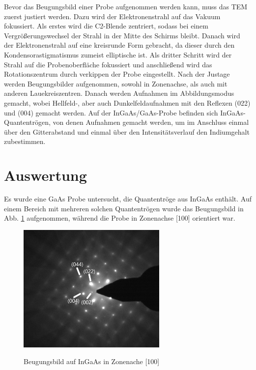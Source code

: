 \documentclass[a4paper,11pt,DIV=11]{scrartcl}
\begin{document}
Bevor das Beugungsbild einer Probe aufgenommen werden kann, muss das TEM zuerst justiert werden. Dazu wird der Elektronenstrahl auf das Vakuum fokussiert. Als erstes wird die C2-Blende zentriert, sodass bei einem Vergrößerungswechsel der Strahl in der Mitte des Schirms bleibt. Danach wird der Elektronenstrahl auf eine kreisrunde Form gebracht, da dieser durch den Kondensorastigmatismus zumeist elliptische ist. Als dritter Schritt wird der Strahl auf die Probenoberfläche fokussiert und anschließend wird das Rotationszentrum durch verkippen der Probe eingestellt. Nach der Justage werden Beugungsbilder aufgenommen, sowohl in Zonenachse, als auch mit anderen Lauekreiszentren. Danach werden Aufnahmen im Abbildungsmodus gemacht, wobei Hellfeld-, aber auch Dunkelfeldaufnahmen mit den Reflexen (022) und (004) gemacht werden. Auf der InGaAs/GaAs-Probe befinden sich InGaAs-Quantentrögen, von denen Aufnahmen gemacht werden, um im Anschluss einmal über den Gitterabstand und einmal über den Intensitätsverlauf den Indiumgehalt zubestimmen.

\section{Auswertung}

Es wurde eine GaAs Probe untersucht, die Quantentröge aus InGaAs enthält. Auf einem Bereich mit mehreren solchen Quantentrögen wurde das Beugungsbild in Abb. \ref{100ind} aufgenommen, während die Probe in Zonenachse [100] orientiert war.

\begin{figure}[h]\centering
	\includegraphics[width=0.65\textwidth]{Versuchsdaten/8/indiziert2.png}
\label{100ind}
\caption{Beugungsbild auf InGaAs in Zonenache [100]}
\end{figure}
\end{document}
